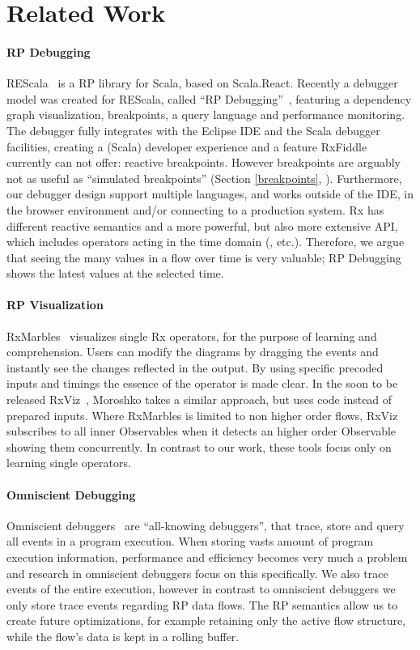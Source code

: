 \section{Related Work}

\paragraph{RP Debugging} 
REScala~\cite{salvaneschi2014rescala} is a RP library for Scala, based on Scala.React. 
Recently a debugger model was created for REScala, called ``RP Debugging''~\cite{salvaneschi2016debugging}, 
featuring a dependency graph visualization, breakpoints, a query language and performance monitoring.
The debugger fully integrates with the Eclipse IDE and the Scala debugger facilities, 
creating a (Scala) developer experience and a feature RxFiddle currently can not offer: reactive breakpoints. 
However breakpoints are arguably not as useful as ``simulated breakpoints'' (Section \ref{breakpoints}, ).
Furthermore, our debugger design support multiple languages, and works outside of the IDE,
in the browser environment and/or connecting to a production system.
Rx has different reactive semantics and a more powerful, but also more extensive API, which includes operators acting in the time domain (, etc.).
Therefore, we argue that seeing the many values in a flow over time is very valuable; 
RP Debugging shows the latest values at the selected time.

\paragraph{RP Visualization} 
RxMarbles~\cite{rxmarbles} visualizes single Rx operators, for the purpose of learning and comprehension.
Users can modify the diagrams by dragging the events and instantly see the changes reflected in the output.
By using specific precoded inputs and timings the essence of the operator is made clear.
In the soon to be released RxViz~\cite{rxviz}, 
Moroshko takes a similar approach, but uses code instead of prepared inputs.
Where RxMarbles is limited to non higher order flows, RxViz subscribes to all inner Observables when it detects an higher order Observable showing them concurrently.
In contrast to our work, these tools focus only on learning single operators.

\paragraph{Omniscient Debugging} Omniscient debuggers~\cite{pothier2009back} are ``all-knowing debuggers'', 
that trace, store and query all events in a program execution.
When storing vasts amount of program execution information, performance and efficiency becomes very much a problem and research in omniscient debuggers focus on this specifically.
We also trace events of the entire execution, however in contrast to omniscient debuggers we only store trace events regarding RP data flows.
The RP semantics allow us to create future optimizations, for example retaining only the active flow structure, while the flow's data is kept in a rolling buffer.

